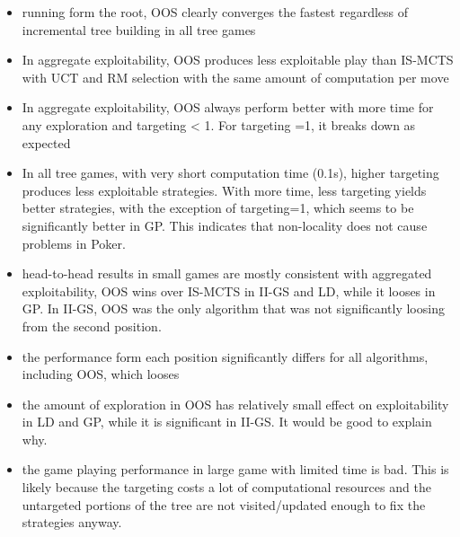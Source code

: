 \begin{itemize}
\item running form the root, OOS clearly converges the fastest regardless of incremental tree building in all tree games
\item In aggregate exploitability, OOS produces less exploitable play than IS-MCTS with UCT and RM selection with the same amount of computation per move
\item In aggregate exploitability, OOS always perform better with more  time for any exploration and targeting < 1. For targeting =1, it breaks down as expected
\item In all tree games, with very short computation time (0.1s), higher targeting produces less exploitable strategies. With more time, less targeting yields better strategies, with the exception of targeting=1, which seems to be significantly better in GP. This indicates that non-locality does not cause problems in Poker.
\item head-to-head results in small games are mostly consistent with aggregated exploitability, OOS wins over IS-MCTS in II-GS and LD, while it looses in GP. In II-GS, OOS was the only algorithm that was not significantly loosing from the second position.
\item the performance form each position significantly differs for all algorithms, including OOS, which looses 
\item the amount of exploration in OOS has relatively small effect on exploitability in LD and GP, while it is significant in II-GS. It would be good to explain why.
\item the game playing performance in large game with limited time is bad. This is likely because the targeting costs a lot of computational resources and the untargeted portions of the tree are not visited/updated enough to fix the strategies anyway.
\end{itemize}



